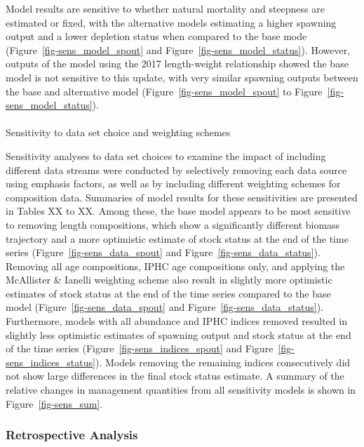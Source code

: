 \documentclass[
]{scrartcl}
\makeatletter
\let\oldparagraph\paragraph
\renewcommand{\paragraph}{
    \@ifstar
      \xxxParagraphStar
      \xxxParagraphNoStar
  }
\newcommand{\xxxParagraphStar}[1]{\oldparagraph*{#1}\mbox{}}
\newcommand{\xxxParagraphNoStar}[1]{\oldparagraph{#1}\mbox{}}
\makeatother
\begin{document}
Model results are sensitive to whether natural mortality and steepness
are estimated or fixed, with the alternative models estimating a higher
spawning output and a lower depletion status when compared to the base
mode (Figure~\ref{fig-sens_model_spout} and
Figure~\ref{fig-sens_model_status}). However, outputs of the model using
the 2017 length-weight relationship showed the base model is not
sensitive to this update, with very similar spawning outputs between the
base and alternative model (Figure~\ref{fig-sens_model_spout} to
Figure~\ref{fig-sens_model_status}).

\paragraph{Sensitivity to data set choice and weighting
schemes}\label{sensitivity-to-data-set-choice-and-weighting-schemes}

Sensitivity analyses to data set choices to examine the impact of
including different data streams were conducted by selectively removing
each data source using emphasis factors, as well as by including
different weighting schemes for composition data. Summaries of model
results for these sensitivities are presented in Tables XX to XX. Among
these, the base model appears to be most sensitive to removing length
compositions, which show a significantly different biomass trajectory
and a more optimistic estimate of stock status at the end of the time
series (Figure~\ref{fig-sens_data_spout} and
Figure~\ref{fig-sens_data_status}). Removing all age compositions, IPHC
age compositions only, and applying the McAllister \& Ianelli weighting
scheme also result in slightly more optimistic estimates of stock status
at the end of the time series compared to the base model
(Figure~\ref{fig-sens_data_spout} and
Figure~\ref{fig-sens_data_status}). Furthermore, models with all
abundance and IPHC indices removed resulted in slightly less optimistic
estimates of spawning output and stock status at the end of the time
series (Figure~\ref{fig-sens_indices_spout} and
Figure~\ref{fig-sens_indices_status}). Models removing the remaining
indices consecutively did not show large differences in the final stock
status estimate. A summary of the relative changes in management
quantities from all sensitivity models is shown in
Figure~\ref{fig-sens_sum}.

\subsubsection{Retrospective Analysis}\label{retrospective-analysis}
\end{document}
